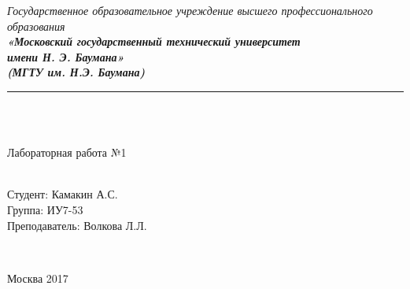 \documentclass[utf8x, 12pt]{G7-32} %
\begin{document}
\frontmatter %



\begin{center}
	\hfill \break
	\textit{
		\normalsize{Государственное образовательное учреждение высшего профессионального образования}}\\ 
	
	\textit{
		\normalsize  {\bf  «Московский государственный технический университет}\\ 
		\normalsize  {\bf имени Н. Э. Баумана»}\\
		\normalsize  {\bf (МГТУ им. Н.Э. Баумана)}\\
	}
	\noindent\rule{\textwidth}{2pt}
	\hfill \break
	\noindent
	\\
	\noindent
	\\
	\hfill\break
	\hfill \break
	\hfill \break
	\hfill \break
	
	\hfill \break
	\large{Лабораторная работа №1\\ }\\
	\hfill \break
	\hfill \break
	\hfill \break
	\hfill \break
	\hfill \break	
	\normalsize {
		\begin{minipage}[t]{7cm}
		\end{minipage}
		\hfill
		\begin{minipage}[t]{7cm}
			\flushright
			Студент: Камакин А.С.\\
			Группа: ИУ7-53\\
			Преподаватель: Волкова Л.Л.
		\end{minipage}
	}\\
	\hfill \break	
	\hfill \break
	\hfill \break
	\hfill \break
	\hfill \break
\end{center}
\hfill \break
\hfill \break
\begin{center} Москва 2017 \end{center}

\thispagestyle{empty} %

\newpage

\mainmatter %
\end{document}
